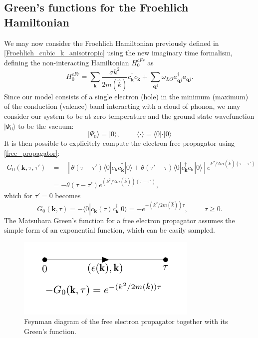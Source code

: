 \subsection{Green's functions for the Froehlich Hamiltonian}
We may now consider the Froehlich Hamiltonian previously defined in \ref{Froehlich_cubic_k_anisotropic} using the new imaginary time formalism,
defining the non-interacting Hamiltonian $H^{cFr}_0$ as 
\begin{equation}
    H^{cFr}_0=\sum_\mathbf{k}\frac{\sigma k^2}{2m(\hat{k})}c^\dagger_{\mathbf{k}}c_\mathbf{k}+\sum_{\mathbf{q}j}\omega_{LO}a^\dagger_{\mathbf{q}j}a_{\mathbf{q}j}.
    \label{polaron_non-interacting}
\end{equation}
Since our model consists of a single electron (hole) in the minimum (maximum) of the conduction (valence) band interacting with a cloud of phonon, we may 
consider our system to be at zero temperature and the ground state wavefunction $|\Psi_0\rangle$ to be the vacuum:
\begin{equation}
    |\Psi_0\rangle=|0\rangle,\hspace{1cm}\langle \cdot \rangle=\langle 0|\cdot|0\rangle
\end{equation}
It is then possible to explicitely compute the electron free propagator using \ref{free_propagator}:
\begin{equation}
\begin{split}
    G_0(\mathbf{k},\tau,\tau')&=-\left[\theta(\tau-\tau')\langle 0| c_\mathbf{k}c^\dagger_\mathbf{k}|0\rangle+\theta(\tau'-\tau)\langle 0 | c^\dagger_\mathbf{k}c_\mathbf{k}|0\rangle\right]e^{k^2/2m(\hat{k})(\tau-\tau')}\\
    &=-\theta(\tau-\tau')e^{(k^2/2m(\hat{k}))(\tau-\tau')},
\end{split}
\end{equation}
which for $\tau'=0$ becomes
\begin{equation}
    G_0(\mathbf{k},\tau)=-\langle 0|c_{\mathbf{k}}(\tau)c^\dagger_\mathbf{k}|0\rangle =-e^{-(k^2/2m(\hat{k}))\tau},\hspace{1cm}\tau\ge0.
\end{equation}
The Matsubara Green's function for a free electron propagator assumes the simple form of an exponential function, which can be easily sampled.
\begin{figure}[H]
    \centering
    \includegraphics[scale=1]{free_el_propagator.pdf}
    \caption{Feynman diagram of the free electron propagator together with its Green's function.}
    \label{fig:el_prop_free}
\end{figure}
